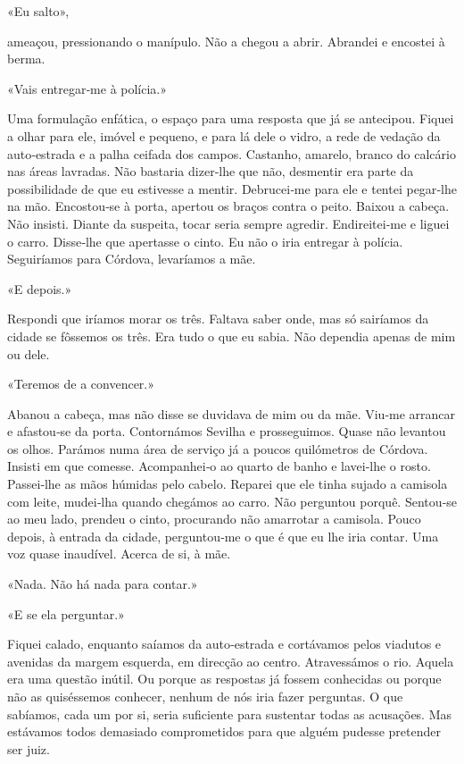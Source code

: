 «Eu salto»,

ameaçou, pressionando o manípulo. Não a chegou a abrir. Abrandei e
encostei à berma.

«Vais entregar­‑me à polícia.»

Uma formulação enfática, o espaço para uma resposta que já se antecipou.
Fiquei a olhar para ele, imóvel e pequeno, e para lá dele o vidro, a
rede de vedação da auto­‑estrada e a palha ceifada dos campos. Castanho,
amarelo, branco do calcário nas áreas lavradas. Não bastaria dizer­‑lhe
que não, desmentir era parte da possibilidade de que eu estivesse a
mentir. Debrucei­‑me para ele e tentei pegar­‑lhe na mão. Encostou­‑se à
porta, apertou os braços contra o peito. Baixou a cabeça. Não insisti.
Diante da suspeita, tocar seria sempre agredir. Endireitei­‑me e liguei
o carro. Disse­‑lhe que apertasse o cinto. Eu não o iria entregar à
polícia. Seguiríamos para Córdova, levaríamos a mãe.

«E depois.»

Respondi que iríamos morar os três. Faltava saber onde, mas só sairíamos
da cidade se fôssemos os três. Era tudo o que eu sabia. Não dependia
apenas de mim ou dele.

«Teremos de a convencer.»

Abanou a cabeça, mas não disse se duvidava de mim ou da mãe. Viu­‑me
arrancar e afastou­‑se da porta. Contornámos Sevilha e prosseguimos.
Quase não levantou os olhos. Parámos numa área de serviço já a poucos
quilómetros de Córdova. Insisti em que comesse. Acompanhei­‑o ao quarto
de banho e lavei­‑lhe o rosto. Passei­‑lhe as mãos húmidas pelo cabelo.
Reparei que ele tinha sujado a camisola com leite, mudei­‑lha quando
chegámos ao carro. Não perguntou porquê. Sentou­‑se ao meu lado, prendeu
o cinto, procurando não amarrotar a camisola. Pouco depois, à entrada da
cidade, perguntou­‑me o que é que eu lhe iria contar. Uma voz quase
inaudível. Acerca de si, à mãe.

«Nada. Não há nada para contar.»

«E se ela perguntar.»

Fiquei calado, enquanto saíamos da auto­‑estrada e cortávamos pelos
viadutos e avenidas da margem esquerda, em direcção ao centro.
Atravessámos o rio. Aquela era uma questão inútil. Ou porque as
respostas já fossem conhecidas ou porque não as quiséssemos conhecer,
nenhum de nós iria fazer perguntas. O que sabíamos, cada um por si,
seria suficiente para sustentar todas as acusações. Mas estávamos todos
demasiado comprometidos para que alguém pudesse pretender ser juiz.


